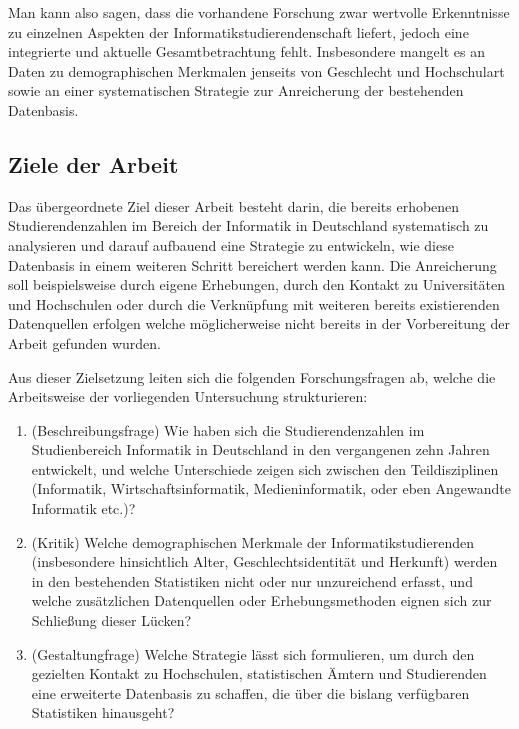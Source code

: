 Man kann also sagen, dass die vorhandene Forschung zwar wertvolle Erkenntnisse zu einzelnen Aspekten der Informatikstudierendenschaft liefert, jedoch eine integrierte und aktuelle Gesamtbetrachtung fehlt. Insbesondere mangelt es an Daten zu demographischen Merkmalen jenseits von Geschlecht und Hochschulart sowie an einer systematischen Strategie zur Anreicherung der bestehenden Datenbasis.

\subsection{Ziele der Arbeit}

Das übergeordnete Ziel dieser Arbeit besteht darin, die bereits erhobenen Studierendenzahlen im Bereich der Informatik in Deutschland systematisch zu analysieren und darauf aufbauend eine Strategie zu entwickeln, wie diese Datenbasis in einem weiteren Schritt bereichert werden kann. Die Anreicherung soll beispielsweise durch eigene Erhebungen, durch den Kontakt zu Universitäten und Hochschulen oder durch die Verknüpfung mit weiteren bereits existierenden Datenquellen erfolgen welche möglicherweise nicht bereits in der Vorbereitung der Arbeit gefunden wurden.

Aus dieser Zielsetzung leiten sich die folgenden Forschungsfragen ab, welche die Arbeitsweise der vorliegenden Untersuchung strukturieren:

\begin{enumerate}
    \item[\textbf{FF1:}] (Beschreibungsfrage) Wie haben sich die Studierendenzahlen im Studienbereich Informatik in Deutschland in den vergangenen zehn Jahren entwickelt, und welche Unterschiede zeigen sich zwischen den Teildisziplinen (Informatik, Wirtschaftsinformatik, Medieninformatik, oder eben Angewandte Informatik etc.)?
    \item[\textbf{FF2:}] (Kritik) Welche demographischen Merkmale der Informatikstudierenden (insbesondere hinsichtlich Alter, Geschlechtsidentität und Herkunft) werden in den bestehenden Statistiken nicht oder nur unzureichend erfasst, und welche zusätzlichen Datenquellen oder Erhebungsmethoden eignen sich zur Schließung dieser Lücken?
    \item[\textbf{FF3:}] (Gestaltungfrage) Welche Strategie lässt sich formulieren, um durch den gezielten Kontakt zu Hochschulen, statistischen Ämtern und Studierenden eine erweiterte Datenbasis zu schaffen, die über die bislang verfügbaren Statistiken hinausgeht?
\end{enumerate}


